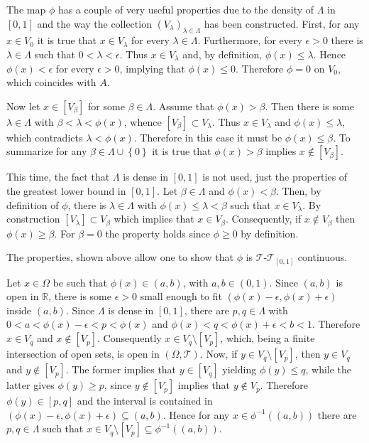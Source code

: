 \documentclass[a4paper]{article}
\newcommand{\obj}[1]{\left\{ #1 \right \}}
\newcommand{\clo}[1]{\left [ #1 \right ]}
\newcommand{\brac}[1]{\left ( #1 \right )}
\newcommand{\Real}{\mathbb{R}}
\newcommand{\Tcal}{\mathcal{T}}
\begin{document}
The map $\phi$ has a couple of very useful properties due to the density of $\Lambda$ in $\clo{0,1}$ and the way the collection $\brac{V_\lambda}_{\lambda \in \Lambda}$ has been constructed. First, for any $x\in V_0$ it is true that $x\in V_\lambda$ for every $\lambda \in \Lambda$. Furthermore, for every $\epsilon > 0$ there is $\lambda \in \Lambda$ such that $0 < \lambda < \epsilon$. Thus $x\in V_\lambda$ and, by definition, $\phi\brac{x} \leq \lambda$. Hence $\phi\brac{x} < \epsilon$ for every $\epsilon > 0$, implying that $\phi\brac{x}\leq 0$. Therefore $\phi = 0$ on $V_0$, which coincides with $A$.

Now let $x\in \clo{V_\beta}$ for some $\beta \in \Lambda$. Assume that $\phi\brac{x} > \beta$. Then there is some $\lambda \in \Lambda$ with $\beta < \lambda < \phi\brac{x}$, whence $\clo{V_\beta} \subset V_\lambda$. Thus $x \in V_\lambda$ and $\phi\brac{x} \leq \lambda$, which contradicts $\lambda < \phi\brac{x}$. Therefore in this case it must be $\phi\brac{x}\leq \beta$. To summarize for any $\beta\in \Lambda \cup \obj{0}$ it is true that $\phi\brac{x} > \beta$ implies $x \notin \clo{V_\beta}$.

This time, the fact that $\Lambda$ is dense in $\clo{0,1}$ is not used, just the properties of the greatest lower bound in $\clo{0,1}$. Let $\beta \in \Lambda$ and $\phi\brac{x} < \beta$. Then, by definition of $\phi$, there is $\lambda\in \Lambda$ with $\phi\brac{x} \leq \lambda < \beta$ such that $x\in V_\lambda$. By construction $\clo{V_\lambda} \subset V_\beta$ which implies that $x\in V_\beta$. Consequently, if $x\notin V_\beta$ then $\phi\brac{x}\geq \beta$. For $\beta = 0$ the property holds since $\phi\geq 0$ by definition.

The properties, shown above allow one to show that $\phi$ is $\Tcal$-$\Tcal_{\clo{0,1}}$ continuous.

Let $x\in \Omega$ be such that $\phi\brac{x} \in \brac{a,b}$, with $a,b \in \brac{0,1}$. Since $\brac{a,b}$ is open in $\Real$, there is some $\epsilon > 0$ small enough to fit $\brac{\phi\brac{x}-\epsilon, \phi\brac{x}+\epsilon}$ inside $\brac{a,b}$. Since $\Lambda$ is dense in $\clo{0,1}$, there are $p,q\in \Lambda$ with $0<a<\phi\brac{x}-\epsilon<p<\phi\brac{x}$ and $\phi\brac{x}<q<\phi\brac{x}+\epsilon<b<1$. Therefore $x\in V_q$ and $x\notin \clo{V_p}$. Consequently $x\in V_q\setminus \clo{V_p}$, which, being a finite intersection of open sets, is open in $\brac{\Omega, \Tcal}$. Now, if $y\in V_q\setminus \clo{V_p}$, then $y\in V_q$ and $y\notin \clo{V_p}$. The former implies that $y\in \clo{V_q}$ yielding $\phi(y)\leq q$, while the latter gives $\phi(y) \geq p$, since $y\notin \clo{V_p}$ implies that $ y\notin V_p$. Therefore $\phi(y)\in \clo{p,q}$ and the interval is contained in $\brac{\phi\brac{x}-\epsilon, \phi\brac{x}+\epsilon} \subseteq \brac{a,b}$. Hence for any $x\in \phi^{-1}\brac{\brac{a,b}}$ there are $p,q\in \Lambda$ such that $x \in V_q\setminus \clo{V_p} \subseteq \phi^{-1}\brac{\brac{a,b}}$.
\end{document}

